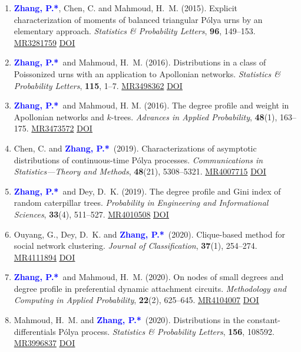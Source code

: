 \documentclass[12pt]{article}
\def \MR #1{\href{http://www.ams.org/mathscinet-getitem?mr=#1}{MR#1}}
\def \DOI #1{\href{http://doi.org/#1}{\underline{DOI}}}
\newcommand{\PZ}{\textcolor{blue}{\textbf{Zhang, P.*}}}
\begin{document}
	\begin{enumerate}
		\item \PZ, {\sc Chen, C.} and {\sc Mahmoud, H.\ M.} 
		(2015). Explicit characterization of moments of balanced 
		triangular P\'{o}lya urns by an elementary approach. 
		\emph{Statistics \& Probability Letters}, {\bf 96}, 
		149--153. \MR{3281759} \DOI{10.1016/j.spl.2014.09.016}
		
		\item \PZ\ and {\sc Mahmoud, H.\ M.} (2016). 
		Distributions in a class of Poissonized urns with an application to Apollonian networks. \emph{Statistics \& Probability Letters}, {\bf 115}, 1--7. \MR{3498362}
		\DOI{10.1016/j.spl.2016.03.023}
		
		\item \PZ\ and {\sc Mahmoud, H. M.} (2016). The 
		degree profile and weight in Apollonian networks and 
		$k$-trees. {\em Advances in Applied Probability}, 
		\textbf{48}(1), 163--175. \MR{3473572} 
		\DOI{10.1017/apr.2015.11}
		
		\item {\sc Chen, C.} and \PZ\ (2019). Characterizations of 
		asymptotic distributions of continuous-time P\'{o}lya 
		processes. {\em Communications in Statistics---Theory and 
		Methods}, \textbf{48}(21), 5308--5321. \MR{4007715} 
		\DOI{10.1080/03610926.2018.1510005}
		
		\item \PZ\ and {\sc Dey, D.\ K.} (2019). The degree 
		profile and Gini index of random caterpillar trees. {\em 
		Probability in Engineering and Informational Sciences}, 
		\textbf{33}(4), 511--527. \MR{4010508} 
		\DOI{10.1017/S0269964818000475}
		
		\item {\sc Ouyang, G., Dey, D.\ K.} and \PZ\ (2020). 
		Clique-based method for social network clustering. {\em 
		Journal of Classification}, \textbf{37}(1), 254--274. 
		\MR{4111894} \DOI{10.1007/s00357-019-9310-5}
		
		\item \PZ\ and {\sc Mahmoud, H.\ M.} (2020). On 
		nodes of small degrees and degree profile in preferential 
		dynamic attachment circuits. {\em Methodology and Computing 
		in Applied Probability}, \textbf{22}(2), 625--645. 
		\MR{4104007} \DOI{10.1007/s11009-019-09726-4}
		
		\item {\sc Mahmoud, H.\ M.} and \PZ\ (2020). 
		Distributions in the constant-differentials P\'{o}lya 
		process. {\em Statistics \& Probability Letters}, 
		\textbf{156}, 108592. \MR{3996837} 
		\DOI{10.1016/j.spl.2019.108592}
		

\end{enumerate}
\end{document}
